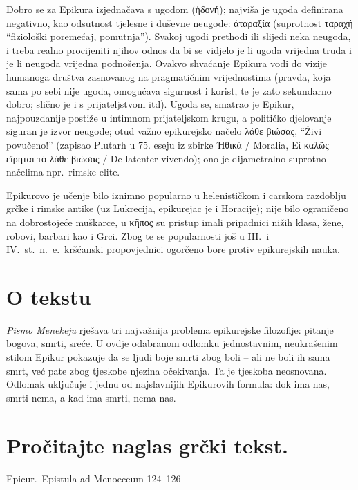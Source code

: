 Dobro se za Epikura izjednačava s ugodom \textgreek{(ἡδονή)}; najviša je ugoda definirana negativno, kao odsutnost tjelesne i duševne neugode: \textgreek{ἀταραξία} (suprotnost ταραχή ``fiziološki poremećaj, pomutnja''). Svakoj ugodi prethodi ili slijedi neka neugoda, i treba realno procijeniti njihov odnos da bi se vidjelo je li ugoda vrijedna truda i je li neugoda vrijedna podnošenja. Ovakvo shvaćanje Epikura vodi do vizije humanoga društva zasnovanog na pragmatičnim vrijednostima (pravda, koja sama po sebi nije ugoda, omogućava sigurnost i korist, te je zato sekundarno dobro; slično je i s prijateljstvom itd). Ugoda se, smatrao je Epikur, najpouzdanije postiže u intimnom prijateljskom krugu, a političko djelovanje siguran je izvor neugode; otud važno epikurejsko načelo \textgreek{λάθε βιώσας}, ``Živi povučeno!'' (zapisao Plutarh u 75. eseju iz zbirke Ἠθικά / Moralia, Εἰ καλῶς εἴρηται τὸ λάθε βιώσας / De latenter vivendo); ono je dijametralno suprotno načelima npr.\ rimske elite.

Epikurovo je učenje bilo iznimno popularno u helenističkom i carskom razdoblju grčke i rimske antike (uz Lukrecija, epikurejac je i Horacije); nije bilo ograničeno na dobrostojeće muškarce, u \textgreek{κῆπος} su pristup imali pripadnici nižih klasa, žene, robovi, barbari kao i Grci. Zbog te se popularnosti još u III.\ i IV.~st.\ n.~e.\ kršćanski propovjednici ogorčeno bore protiv epikurejskih nauka.

\section*{O tekstu}

\textit{Pismo Menekeju} rješava tri najvažnija problema epikurejske filozofije: pitanje bogova, smrti, sreće. U ovdje odabranom odlomku jednostavnim, neukrašenim stilom Epikur pokazuje da se ljudi boje smrti zbog boli – ali ne boli ih sama smrt, već pate zbog tjeskobe njezina očekivanja. Ta je tjeskoba neosnovana. Odlomak uključuje i jednu od najslavnijih Epikurovih formula: dok ima nas, smrti nema, a kad ima smrti, nema nas.

\newpage

\section*{Pročitajte naglas grčki tekst.}

Epicur.\ Epistula ad Menoeceum 124–126


